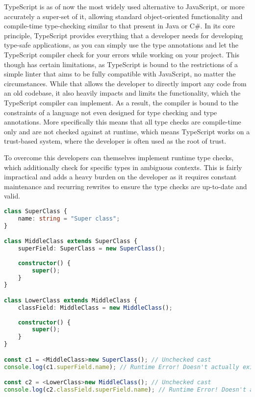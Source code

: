 TypeScript is as of now the most widely used alternative to JavaScript, or more accurately a super-set of it, allowing standard object-oriented functionality and compile-time type-checking similar to that present in Java or C\#. In its core principle, TypeScript provides everything that a developer needs for developing type-safe applications, as you can simply use the type annotations and let the TypeScript compiler check for your errors while working on your project. This though has certain limitations, as TypeScript is bound to the restrictions of a simple linter that aims to be fully compatible with JavaScript, no matter the circumstances. While that allows the developer to directly import any code from an old codebase, it also heavily impacts and limits the functionality, which the TypeScript compiler can implement. As a result, the compiler is bound to the constraints of a language not even designed for type checking and type annotations. More specifically this means that all type checks are compile-time only and are not checked against at runtime, which means TypeScript works on a trust-based system, where the developer is often used as the root of trust.

To overcome this developers can themselves implement runtime type checks, which additionally check for specific types in ambiguous contexts. This is fairly impractical and adds a heavy burden on the developer as it requires constant maintenance and recurring rewrites to ensure the type checks are up-to-date and valid.

\begin{lstlisting}[language=TypeScript]
class SuperClass {
	name: string = "Super class";
}

class MiddleClass extends SuperClass {
	superField: SuperClass = new SuperClass();
	
	constructor() {
		super();
	}
}

class LowerClass extends MiddleClass {
	classField: MiddleClass = new MiddleClass();
	
	constructor() {
		super();
	}
}

const c1 = <MiddleClass>new SuperClass(); // Unchecked cast
console.log(c1.superField.name); // Runtime Error! Doesn't actually exist

const c2 = <LowerClass>new MiddleClass(); // Unchecked cast
console.log(c2.classField.superField.name); // Runtime Error! Doesn't actually exist
\end{lstlisting}

